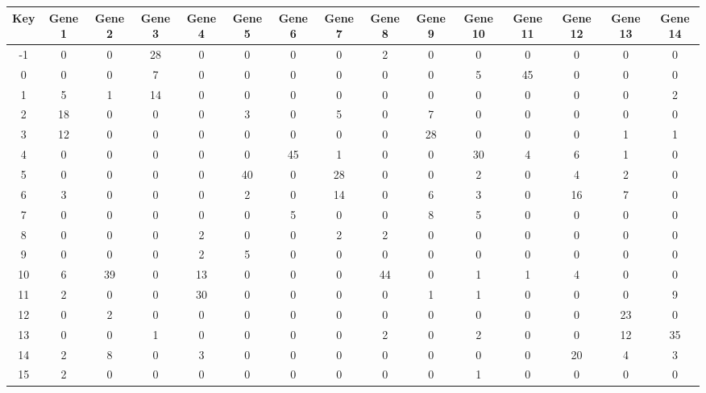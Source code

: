 \begin{tabular}{|c|c|c|c|c|c|c|c|c|c|c|c|c|c|c|}
\hline
Key & Gene 1 & Gene 2 & Gene 3 & Gene 4 & Gene 5 & Gene 6 & Gene 7 & Gene 8 & Gene 9 & Gene 10 & Gene 11 & Gene 12 & Gene 13 & Gene 14 \\
\hline
-1 & 0 & 0 & 28 & 0 & 0 & 0 & 0 & 2 & 0 & 0 & 0 & 0 & 0 & 0 \\
0 & 0 & 0 & 7 & 0 & 0 & 0 & 0 & 0 & 0 & 5 & 45 & 0 & 0 & 0 \\
1 & 5 & 1 & 14 & 0 & 0 & 0 & 0 & 0 & 0 & 0 & 0 & 0 & 0 & 2 \\
2 & 18 & 0 & 0 & 0 & 3 & 0 & 5 & 0 & 7 & 0 & 0 & 0 & 0 & 0 \\
3 & 12 & 0 & 0 & 0 & 0 & 0 & 0 & 0 & 28 & 0 & 0 & 0 & 1 & 1 \\
4 & 0 & 0 & 0 & 0 & 0 & 45 & 1 & 0 & 0 & 30 & 4 & 6 & 1 & 0 \\
5 & 0 & 0 & 0 & 0 & 40 & 0 & 28 & 0 & 0 & 2 & 0 & 4 & 2 & 0 \\
6 & 3 & 0 & 0 & 0 & 2 & 0 & 14 & 0 & 6 & 3 & 0 & 16 & 7 & 0 \\
7 & 0 & 0 & 0 & 0 & 0 & 5 & 0 & 0 & 8 & 5 & 0 & 0 & 0 & 0 \\
8 & 0 & 0 & 0 & 2 & 0 & 0 & 2 & 2 & 0 & 0 & 0 & 0 & 0 & 0 \\
9 & 0 & 0 & 0 & 2 & 5 & 0 & 0 & 0 & 0 & 0 & 0 & 0 & 0 & 0 \\
10 & 6 & 39 & 0 & 13 & 0 & 0 & 0 & 44 & 0 & 1 & 1 & 4 & 0 & 0 \\
11 & 2 & 0 & 0 & 30 & 0 & 0 & 0 & 0 & 1 & 1 & 0 & 0 & 0 & 9 \\
12 & 0 & 2 & 0 & 0 & 0 & 0 & 0 & 0 & 0 & 0 & 0 & 0 & 23 & 0 \\
13 & 0 & 0 & 1 & 0 & 0 & 0 & 0 & 2 & 0 & 2 & 0 & 0 & 12 & 35 \\
14 & 2 & 8 & 0 & 3 & 0 & 0 & 0 & 0 & 0 & 0 & 0 & 20 & 4 & 3 \\
15 & 2 & 0 & 0 & 0 & 0 & 0 & 0 & 0 & 0 & 1 & 0 & 0 & 0 & 0 \\
\hline
\end{tabular}
